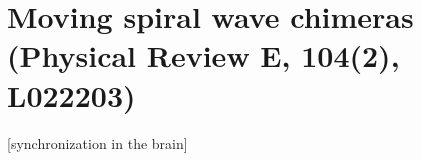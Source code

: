 \chapter{Moving spiral wave chimeras (Physical Review E, 104(2), L022203)}

[synchronization in the brain] \cite{erra2017neuralsynchronization}


